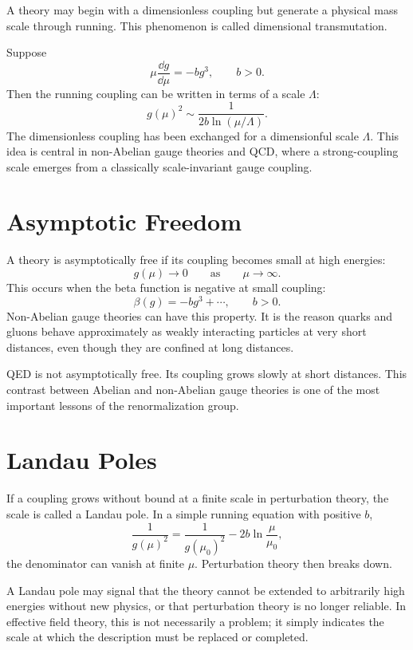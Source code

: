 A theory may begin with a dimensionless coupling but generate a physical mass
scale through running. This phenomenon is called dimensional transmutation.

Suppose
\[
    \mu\frac{\dd g}{\dd\mu}=-b g^3,
    \qquad b>0.
\]
Then the running coupling can be written in terms of a scale \(\Lambda\):
\[
    g(\mu)^2\sim \frac{1}{2b\ln(\mu/\Lambda)}.
\]
The dimensionless coupling has been exchanged for a dimensionful scale
\(\Lambda\). This idea is central in non-Abelian gauge theories and QCD, where a
strong-coupling scale emerges from a classically scale-invariant gauge coupling.

\section{Asymptotic Freedom}

A theory is asymptotically free if its coupling becomes small at high energies:
\[
    g(\mu)\longrightarrow0
    \qquad \text{as} \qquad \mu\to\infty.
\]
This occurs when the beta function is negative at small coupling:
\[
    \beta(g)=-b g^3+\cdots,
    \qquad b>0.
\]
Non-Abelian gauge theories can have this property. It is the reason quarks and
gluons behave approximately as weakly interacting particles at very short
distances, even though they are confined at long distances.

QED is not asymptotically free. Its coupling grows slowly at short distances.
This contrast between Abelian and non-Abelian gauge theories is one of the most
important lessons of the renormalization group.

\section{Landau Poles}

If a coupling grows without bound at a finite scale in perturbation theory, the
scale is called a Landau pole. In a simple running equation with positive
\(b\),
\[
    \frac{1}{g(\mu)^2}
    = \frac{1}{g(\mu_0)^2}-2b\ln\frac{\mu}{\mu_0},
\]
the denominator can vanish at finite \(\mu\). Perturbation theory then breaks
down.

A Landau pole may signal that the theory cannot be extended to arbitrarily high
energies without new physics, or that perturbation theory is no longer reliable.
In effective field theory, this is not necessarily a problem; it simply indicates
the scale at which the description must be replaced or completed.

